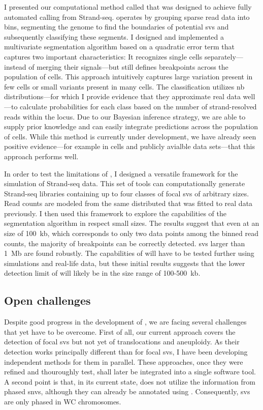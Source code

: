I presented our computational method called \mc that was designed to achieve
fully automated \sv calling from Strand-seq. \mc operates by grouping sparse
read data into bins, segmenting the genome to find the boundaries of potential
\acp{sv} and subsequently classifying these segments. I designed and implemented
a multivariate segmentation algorithm based on a quadratic error term that
captures two important characteristics: It recognizes single cells
separately---instead of merging their signals---but still defines breakpoints
across the population of cells. This approach intuitively captures large
variation present in few cells or small variants present in many cells. The \sv
classification utilizes \acl{nb} distributions---for which I provide evidence
that they approximate real data well---to calculate probabilities for each \sv
class based on the number of strand-resolved reads within the locus.
Due to our Bayesian inference strategy, we are able to supply prior knowledge
and can easily integrate \sv predictions across the population of cells. While
this method is currently under development, we have already seen positive
evidence---for example in \rpe cells and publicly avialble data sets---that this
approach performs well.

In order to test the limitations of \mc, I designed a versatile framework for
the simulation of Strand-seq data. This set of tools can computationally generate
Strand-seq libraries containing up to four classes of focal \acp{sv} of arbitrary
sizes. Read counts are modeled from the same \nb distributed that was fitted to
real data previously. I then used this framework to explore the capabilities of
the segmentation algorithm in respect small \sv sizes. The results suggest that
even at an \sv size of 100~kb, which corresponds to only two data points among
the binned read counts, the majority of breakpoints can be correctly detected.
\Acp{sv} larger than 1~Mb are found robustly. The capabilities of \mc will have
to be tested further using simulations and real-life data, but these initial
results suggests that the lower detection limit of \mc will likely be in the
size range of 100-500~kb.




\subsection{Open challenges}
\label{sec:mosaic_challenges}

Despite good progress in the development of \mc, we are facing several
challenges that yet have to be overcome. First of all, our current approach
covers the detection of focal \acp{sv} but not yet of translocations and
aneuploidy. As their detection works principally different than for focal \acp{sv},
I have been developing independent methods for them in parallel. These approaches,
once they were refined and thouroughly test, shall later be integrated into a
single software tool. A second point is that, in its current state, \mc does not
utilize the information from phased \acp{snv}, although they can already be
annotated using \strandphaser. Consequently, \acp{sv} are only phased in WC
chromosomes.

